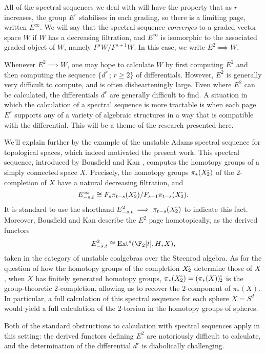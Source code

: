 \documentclass[11pt]{article}
\theoremstyle{plain}
\begin{document}
All of the spectral sequences we deal with will have the property that as $r$ increases, the group $E^r$ stabilises in each grading, so there is a limiting page, written $E^\infty$. We will say that the spectral sequence \emph{converges} to a graded vector space $W$ if $W$ has a decreasing filtration, and $E^\infty$ is isomorphic to the associated graded object of $W$, namely $F^sW/F^{s+1}W$. In this case, we write $E^2\implies W$.

Whenever $E^2\implies W$, one may hope to calculate $W$ by first computing $E^2$ and then computing the sequence $\{d^r\,;\,r\geq2\}$ of differentials. However, $E^2$ is generally very difficult to compute, and is often dishearteningly large. Even where $E^2$ can be calculated, the differentials $d^r$ are generally difficult to find.
A situation in which the calculation of a spectral sequence is more tractable is when each page $E^r$ supports any of a variety of algebraic structures in a way that is compatible with the differential. This will be a theme of the research presented here.

We'll explain further by the example of the unstable Adams spectral sequence for topological spaces, which indeed motivated the present work. This spectral sequence, introduced by Bousfield and Kan \cite{BousKanSSeq.pdf}, computes the homotopy groups of a simply connected space $X$. Precisely, the homotopy groups $\pi_*(X{\hat{\,}_\textup{\!\!2}})$ of the $2$-completion of $X$ have a natural decreasing filtration, and%
\[E^\infty_{-s,t}\cong F_s\pi_{t-s}(X{\hat{\,}_\textup{\!\!2}})/F_{s+1}\pi_{t-s}(X{\hat{\,}_\textup{\!\!2}}).\]
It is standard to use the shorthand $E^2_{-s,t}\implies \pi_{t-s}(X{\hat{\,}_\textup{\!\!2}})$ to indicate this fact. Moreover, Bousfield and Kan describe the $E^2$ page homotopically, as the derived functors
\[E^2_{-s,t}\cong \Ext^s(\F_2[t],H_*X),\]
taken in the category of unstable coalgebras over the Steenrod algebra. As for the question of how the homotopy groups of the completion $X{\hat{\,}_\textup{\!\!2}}$ determine those of $X$, when $X$ has finitely generated homotopy groups, $\pi_*(X{\hat{\,}_\textup{\!\!2}})=(\pi_*(X)){\hat{\,}_\textup{\!\!2}}$ is the group-theoretic $2$-completion, allowing us to recover the $2$-component of $\pi_*(X)$. In particular, a full calculation of this spectral sequence for each sphere $X=S^d$ would yield a full calculation of the 2-torsion in the homotopy groups of spheres.

Both of the standard obstructions to calculation with spectral sequences apply in this setting: the derived functors defining $E^2$ are notoriously difficult to calculate, and the determination of the differential $d^r$ is diabolically challenging. 
\end{document}
